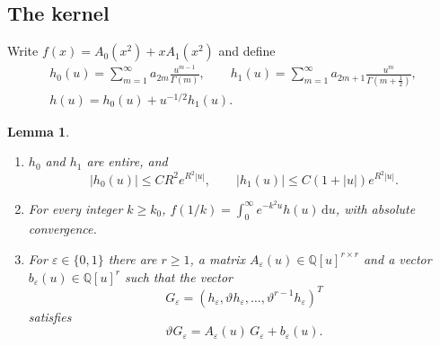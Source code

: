 \documentclass[11pt]{amsart}
\newtheorem{lemma}[theorem]{Lemma}
\theoremstyle{definition}
\theoremstyle{remark}
\newcommand{\dd}{\,\mathrm{d}}
\newcommand{\QQ}{\mathbb{Q}}
\begin{document}
\subsection{The kernel}
Write $f(x) = A_0(x^2) + x A_1(x^2)$ and define
\begin{equation}\label{eq:kernels}
\begin{gathered}
  h_0(u) = \sum_{m=1}^{\infty} a_{2m}\frac{u^{m-1}}{\Gamma(m)}, \qquad
  h_1(u) = \sum_{m=1}^{\infty} a_{2m+1} \frac{u^{m}}{\Gamma(m+\frac12)}, \\
  h(u) = h_0(u) + u^{-1/2} h_1(u).
\end{gathered}
\end{equation}

\begin{lemma}\label{lem:kernel}
\begin{enumerate}
\item $h_0$ and $h_1$ are entire, and
\[
  |h_0(u)| \le C R^2 e^{R^2|u|}, \qquad |h_1(u)| \le C (1 + |u|)e^{R^2|u|}.
\]
\item For every integer $k \ge k_0$, $f(1/k) = \int_0^\infty e^{-k^2 u} h(u)\dd u$, with absolute convergence.
\item For $\varepsilon \in \{0,1\}$ there are $r \ge 1$, a matrix $A_\varepsilon(u) \in \QQ[u]^{r\times r}$ and a vector
$b_\varepsilon(u) \in \QQ[u]^r$ such that the vector
\[
  G_\varepsilon = (h_\varepsilon, \vartheta h_\varepsilon, \dots, \vartheta^{r-1}h_\varepsilon)^T
\]
satisfies
\begin{equation}\label{eq:Gsys}
  \vartheta G_\varepsilon = A_\varepsilon(u)\, G_\varepsilon + b_\varepsilon(u).
\end{equation}
\end{enumerate}
\end{lemma}
\end{document}
